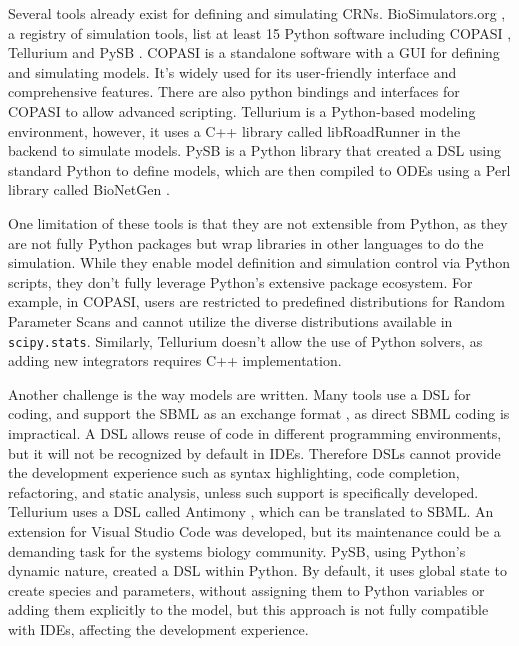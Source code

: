 \documentclass{article}
\begin{document}
Several tools already exist for defining and simulating \acp{CRN}.
BioSimulators.org \cite{shaikhBioSimulatorsCentralRegistry2022}, a registry of simulation tools,
list at least 15 Python software including COPASI \cite{hoopsCOPASICOmplexPAthway2006},
Tellurium \cite{choiTelluriumExtensiblePythonbased2018} and PySB \cite{lopezProgrammingBiologicalModels2013}. COPASI is a
standalone software with a \ac{GUI} for defining and simulating models. It's
widely used for its user-friendly interface and comprehensive features.
There are also python bindings and interfaces for COPASI to allow
advanced scripting. Tellurium is a Python-based modeling environment,
however, it uses a C++ library called libRoadRunner in the backend to
simulate models. PySB is a Python library that created a \ac{DSL} using
standard Python to define models, which are then compiled to \acp{ODE} using a
Perl library called BioNetGen \cite{harrisBioNetGenAdvancesRulebased2016}.

One limitation of these tools is that they are not extensible from
Python, as they are not fully Python packages but wrap libraries in
other languages to do the simulation. While they enable model definition
and simulation control via Python scripts, they don't fully leverage
Python's extensive package ecosystem. For example, in COPASI, users are
restricted to predefined distributions for Random Parameter Scans and
cannot utilize the diverse distributions available in
\texttt{scipy.stats}. Similarly, Tellurium doesn't allow the use of
Python solvers, as adding new integrators requires C++ implementation.



Another challenge is the way models are written. Many tools use a \ac{DSL} for coding, and support the
\ac{SBML} as an exchange format \cite{huckaSBMLL3V2}, as
direct \ac{SBML} coding is impractical. A \ac{DSL} allows reuse of code in
different programming environments, but it will not be recognized by
default in \acp{IDE}. Therefore \acp{DSL}
cannot provide the development experience such as syntax highlighting,
code completion, refactoring, and static analysis, unless such support
is specifically developed. Tellurium uses a
\ac{DSL} called Antimony \cite{smithAntimonyModularModel2009}, which can be translated to
\ac{SBML}. An extension for Visual Studio Code was developed, but its
maintenance could be a demanding task for the systems biology community.
PySB, using Python's dynamic nature, created a \ac{DSL} within Python. By
default, it uses global state to create species and parameters, without
assigning them to Python variables or adding them explicitly to the
model, but this approach is not fully compatible with \acp{IDE}, affecting
the development experience.
\end{document}
